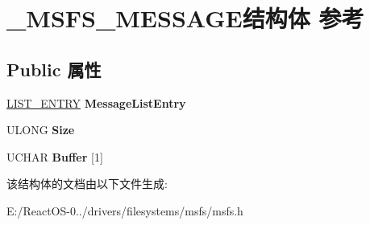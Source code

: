 \hypertarget{struct___m_s_f_s___m_e_s_s_a_g_e}{}\section{\+\_\+\+M\+S\+F\+S\+\_\+\+M\+E\+S\+S\+A\+G\+E结构体 参考}
\label{struct___m_s_f_s___m_e_s_s_a_g_e}
\subsection*{Public 属性}
\begin{DoxyCompactItemize}
\item 
\mbox{\label{struct___m_s_f_s___m_e_s_s_a_g_e_aa45d823a614edb55f4059f415bc37487}} 
\hyperlink{struct___l_i_s_t___e_n_t_r_y}{L\+I\+S\+T\+\_\+\+E\+N\+T\+RY} {\bfseries Message\+List\+Entry}
\item 
\mbox{\label{struct___m_s_f_s___m_e_s_s_a_g_e_af859393221946f4bb8e5fcef4964b8ec}} 
U\+L\+O\+NG {\bfseries Size}
\item 
\mbox{\label{struct___m_s_f_s___m_e_s_s_a_g_e_ab02208b46f2e7f1fd7e170e3ce19a1ea}} 
U\+C\+H\+AR {\bfseries Buffer} \mbox{[}1\mbox{]}
\end{DoxyCompactItemize}


该结构体的文档由以下文件生成\+:\begin{DoxyCompactItemize}
\item 
E\+:/\+React\+O\+S-\/0../drivers/filesystems/msfs/msfs.\+h\end{DoxyCompactItemize}
